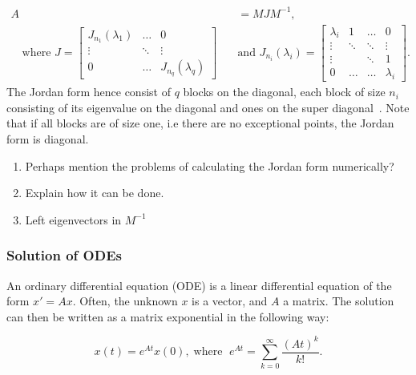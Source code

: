 \documentclass[../main.tex]{subfiles}
\begin{document}
\begin{equation}\label{eq:jordan}
\begin{aligned}
    A &= MJM^{-1}, \\ \quad \text{where } J = \begin{bmatrix}J_{n_1}(\lambda_1) & \dots & 0 \\
                                                         \vdots & \ddots & \vdots \\
                                                         0 & \dots &  J_{n_q}(\lambda_q)\end{bmatrix} \quad
      &\text{and } J_{n_i}(\lambda_i) = \begin{bmatrix} \lambda_i & 1 & \dots & 0 \\
                                                                                        \vdots  & \ddots & \ddots & \vdots \\
                                                                                        \vdots & & \ddots& 1 \\
                                                                                        0 & \dots & \dots & \lambda_i\end{bmatrix}.
\end{aligned}
\end{equation}
The Jordan form hence consist of $q$ blocks on the diagonal, each block of size $n_i$ consisting of its eigenvalue on the diagonal and ones on the super diagonal~\cite{uffe}. Note that if all blocks are of size one, i.e there are no exceptional points, the Jordan form is diagonal.
\begin{enumerate}
    \item Perhaps mention the problems of calculating the Jordan form numerically?
    \item Explain how it can be done.
    \item Left eigenvectors in $M^{-1}$
\end{enumerate}

\subsubsection{Solution of ODEs}
An ordinary differential equation (ODE) is a linear differential equation of the form $x'=Ax$. Often, the unknown $x$ is a vector, and $A$ a matrix. The solution can then be written as a matrix exponential in the following way:

\begin{equation}
    x(t) = e^{At}x(0), \;\text{where } \;e^{At} = \sum_{k=0}^{\infty}\frac{(At)^k}{k!}.
\end{equation}
\end{document}
